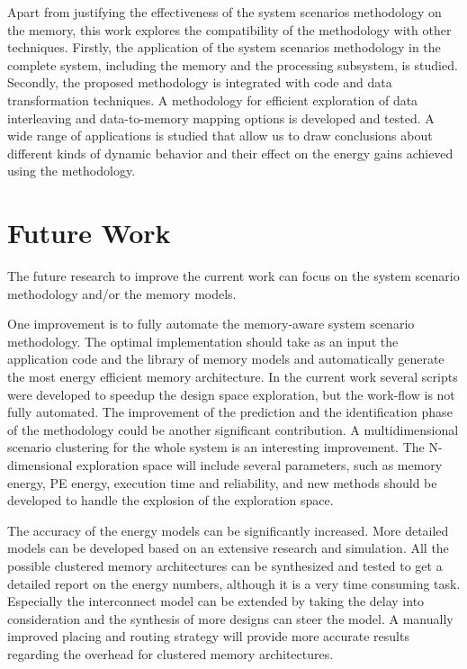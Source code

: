 Apart from justifying the effectiveness of the system scenarios methodology on the memory, this work explores the compatibility of the methodology with other techniques.
Firstly, the application of the system scenarios methodology in the complete system, including the memory and the processing subsystem, is studied.
Secondly, the proposed methodology is integrated with code and data transformation techniques.
A methodology for efficient exploration of data interleaving and data-to-memory mapping options is developed and tested.
A wide range of applications is studied that allow us to draw conclusions about different kinds of dynamic behavior and their effect on the energy gains achieved using the methodology. 

\section{Future Work}

The future research to improve the current work can focus on the system scenario methodology and/or the memory models.

One improvement is to fully automate the memory-aware system scenario methodology.
The optimal implementation should take as an input the application code and the library of memory models and automatically generate the most energy efficient memory architecture.
In the current work several scripts were developed to speedup the design space exploration, but the work-flow is not fully automated.
The improvement of the prediction and the identification phase of the methodology could be another significant contribution. 
A multidimensional scenario clustering for the whole system is an interesting improvement.
The N-dimensional exploration space will include several parameters, such as memory energy, PE energy, execution time and reliability, and new methods should be developed to handle the explosion of the exploration space.

The accuracy of the energy models can be significantly increased.
More detailed models can be developed based on an extensive research and simulation.
All the possible clustered memory architectures can be synthesized and tested to get a detailed report on the energy numbers, although it is a very time consuming task.
Especially the interconnect model can be extended by taking the delay into consideration and the synthesis of more designs can steer the model.
A manually improved placing and routing strategy will provide more accurate results regarding the overhead for clustered memory architectures.



